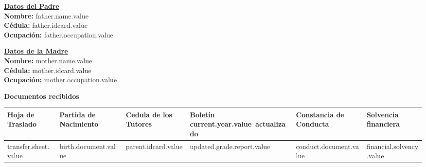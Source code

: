 \documentclass[12pt]{article}
\newcommand{\aField}[1]{#1}
\newcommand{\fatherName}{father.name.value}
\newcommand{\fatherIdcard}{father.idcard.value}
\newcommand{\fatherOccupation}{father.occupation.value}
\newcommand{\motherName}{mother.name.value}
\newcommand{\motherIdcard}{mother.idcard.value}
\newcommand{\motherOccupation}{mother.occupation.value}
\newcommand{\currentYear}{current.year.value}
\newcommand{\transferSheet}{transfer.sheet.value}
\newcommand{\birthDocument}{birth.document.value}
\newcommand{\parentIdcard}{parent.idcard.value}
\newcommand{\updatedGradeReport}{updated.grade.report.value}
\newcommand{\conductDocument}{conduct.document.value}
\newcommand{\financialSolvency}{financial.solvency.value}
\begin{document}
    \par\vspace{4mm}
    \begin{minipage}[t]{0.48\textwidth}
        \textbf{\uline{Datos del Padre}}\\
        \textbf{Nombre:} \aField{\fatherName}\\
        \textbf{Cédula:} \aField{\fatherIdcard}\\
        \textbf{Ocupación:} \aField{\fatherOccupation}
    \end{minipage}
    \hfill
    \begin{minipage}[t]{0.48\textwidth}
        \textbf{\uline{Datos de la Madre}}\\
        \textbf{Nombre:} \aField{\motherName}\\
        \textbf{Cédula:} \aField{\motherIdcard}\\
        \textbf{Ocupación:} \aField{\motherOccupation}
    \end{minipage}   

    \par\vspace{8mm}
    \textbf{Documentos recibidos}
    \begin{table}[H]
        \centering
        \begin{tabular}{|p{1.8cm}|p{2.3cm}|p{2.4cm}|p{2.6cm}|p{2.5cm}|p{2cm}|}
            \hline
            Hoja de Traslado &
            Partida de Nacimiento &
            Cedula de los Tutores &
            Boletín \currentYear\ actualizado &
            Constancia de Conducta &
            Solvencia financiera\\
            \hline
            \hspace{7mm}\transferSheet &
            \hspace{7mm}\birthDocument &
            \hspace{7mm}\parentIdcard &
            \hspace{7mm}\updatedGradeReport &
            \hspace{7mm}\conductDocument &
            \hspace{7mm}\financialSolvency\\
            \hline
        \end{tabular}
    \end{table}
    
\end{document}
